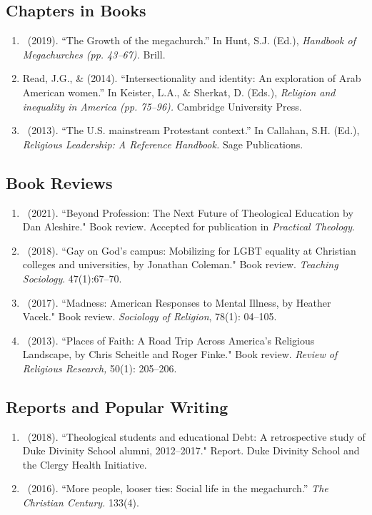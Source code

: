 \subsection*{Chapters in Books}
\begin{enumerate} 
\item \Eagle\ (2019). ``The Growth of the megachurch.'' In Hunt, S.J. (Ed.), \emph{Handbook of Megachurches (pp. 43--67).} Brill.

\item Read, J.G., \& \Eagle \hspace{.01em}  (2014). ``Intersectionality and identity: An exploration of Arab American women.'' In Keister, L.A., \& Sherkat, D. (Eds.), \emph{Religion and inequality in America (pp. 75--96).} Cambridge University Press.

\item \Eagle\ (2013). ``The U.S. mainstream Protestant context.'' In Callahan, S.H. (Ed.), \emph{Religious Leadership: A Reference Handbook.} Sage Publications.
\end{enumerate}

\subsection*{Book Reviews}
\begin{enumerate} 
\item \Eagle\  (2021). ``Beyond Profession: The Next Future of Theological Education by Dan Aleshire." Book review. Accepted for publication in \emph{Practical Theology}.
	
\item \Eagle\  (2018). ``Gay on God’s campus: Mobilizing for LGBT equality at Christian colleges and universities, by Jonathan Coleman." Book review. \emph{Teaching Sociology}. 47(1):67--70. 

\item \Eagle\ (2017). ``Madness: American Responses to Mental Illness, by Heather Vacek." Book review. \emph{Sociology of Religion}, 78(1): 04--105. 

\item \Eagle\ (2013). ``Places of Faith: A Road Trip Across America's Religious Landscape, by Chris Scheitle and Roger Finke." Book review.  \emph{Review of Religious Research,} 50(1): 205--206.
\end{enumerate}

\subsection*{Reports and Popular Writing}
\begin{enumerate} 
\item \Eagle\ (2018). ``Theological students and educational Debt: A retrospective study of Duke Divinity School alumni, 2012--2017." Report. Duke Divinity School and the Clergy Health Initiative.

\item \Eagle\ (2016). ``More people, looser ties: Social life in the megachurch.'' \emph{The Christian Century.} 133(4).
\end{enumerate}